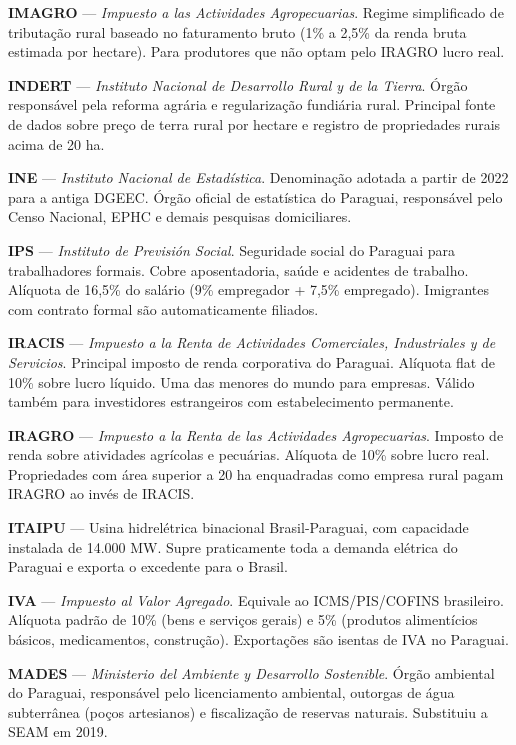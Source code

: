 \medskip
\noindent\textbf{IMAGRO} — \textit{Impuesto a las Actividades Agropecuarias}. Regime simplificado de tributação rural baseado no faturamento bruto (1\% a 2,5\% da renda bruta estimada por hectare). Para produtores que não optam pelo IRAGRO lucro real.

\medskip
\noindent\textbf{INDERT} — \textit{Instituto Nacional de Desarrollo Rural y de la Tierra}. Órgão responsável pela reforma agrária e regularização fundiária rural. Principal fonte de dados sobre preço de terra rural por hectare e registro de propriedades rurais acima de 20 ha.

\medskip
\noindent\textbf{INE} — \textit{Instituto Nacional de Estadística}. Denominação adotada a partir de 2022 para a antiga DGEEC. Órgão oficial de estatística do Paraguai, responsável pelo Censo Nacional, EPHC e demais pesquisas domiciliares.

\medskip
\noindent\textbf{IPS} — \textit{Instituto de Previsión Social}. Seguridade social do Paraguai para trabalhadores formais. Cobre aposentadoria, saúde e acidentes de trabalho. Alíquota de 16,5\% do salário (9\% empregador + 7,5\% empregado). Imigrantes com contrato formal são automaticamente filiados.

\medskip
\noindent\textbf{IRACIS} — \textit{Impuesto a la Renta de Actividades Comerciales, Industriales y de Servicios}. Principal imposto de renda corporativa do Paraguai. Alíquota flat de 10\% sobre lucro líquido. Uma das menores do mundo para empresas. Válido também para investidores estrangeiros com estabelecimento permanente.

\medskip
\noindent\textbf{IRAGRO} — \textit{Impuesto a la Renta de las Actividades Agropecuarias}. Imposto de renda sobre atividades agrícolas e pecuárias. Alíquota de 10\% sobre lucro real. Propriedades com área superior a 20 ha enquadradas como empresa rural pagam IRAGRO ao invés de IRACIS.

\medskip
\noindent\textbf{ITAIPU} — Usina hidrelétrica binacional Brasil-Paraguai, com capacidade instalada de 14.000 MW. Supre praticamente toda a demanda elétrica do Paraguai e exporta o excedente para o Brasil.

\medskip
\noindent\textbf{IVA} — \textit{Impuesto al Valor Agregado}. Equivale ao ICMS/PIS/COFINS brasileiro. Alíquota padrão de 10\% (bens e serviços gerais) e 5\% (produtos alimentícios básicos, medicamentos, construção). Exportações são isentas de IVA no Paraguai.

\medskip
\noindent\textbf{MADES} — \textit{Ministerio del Ambiente y Desarrollo Sostenible}. Órgão ambiental do Paraguai, responsável pelo licenciamento ambiental, outorgas de água subterrânea (poços artesianos) e fiscalização de reservas naturais. Substituiu a SEAM em 2019.

